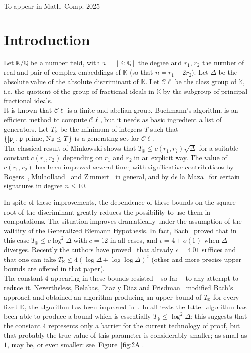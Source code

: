 \documentclass[a4paper,11pt]{amsart}
\newcommand{\field}[1]{\mathbb{{#1}}}
\newcommand{\ideal}[1]{\mathfrak{{#1}}}
\newcommand{\Q}{\field{{Q}}}
\newcommand{\K}{\field{{K}}}
\newcommand{\p}{\ideal{p}}
\newcommand{\Norm}{\textrm{\upshape N}}
\newcommand{\Cl}{\mathcal C\!\ell}
\theoremstyle{remark}
\begin{document}
\begin{center}
To appear in Math. Comp. 2025
\end{center}


\section{Introduction}\label{sec:1A}
Let $\K/\Q$ be a number field, with $n=[\K:\Q]$ the degree and $r_1$, $r_2$ the number of real and pair of
complex embeddings of $\K$ (so that $n=r_1+2r_2$). Let $\Delta$ be the absolute value of the absolute
discriminant of $\K$. Let $\Cl$ be the class group of $\K$, i.e. the quotient of the group of
fractional ideals in $\K$ by the subgroup of principal fractional ideals.\\
%
It is known that $\Cl$ is a finite and abelian group. Buchmann's algorithm is an efficient method to
compute $\Cl$, but it needs as basic ingredient a list of generators. Let $T_\K$ be the minimum of
integers $T$ such that $\{[\p]\colon \p\text{ prime, } \Norm\p \leq T\}$ is a generating set for
$\Cl$.\\
%
The classical result of Minkowski shows that $T_\K \leq c(r_1,r_2)\sqrt{\Delta}$ for a suitable constant
$c(r_1,r_2)$ depending on $r_1$ and $r_2$ in an explicit way. The value of $c(r_1,r_2)$ has been improved
several time, with significative contributions by Rogers~\cite{Rogers}, Mulholland~\cite{Mulholland} and
Zimmert~\cite{Zimmert} in general, and by de la Maza~\cite{Maza} for certain signatures in degree $n\leq
10$.

In spite of these improvements, the dependence of these bounds on the square root of the discriminant
greatly reduces the possibility to use them in computations. The situation improves dramatically under
the assumption of the validity of the Generalized Riemann Hypothesis. In fact, Bach~\cite{Bach2} proved
that in this case $T_\K \leq c\log^2\Delta$ with $c=12$ in all cases, and $c=4+o(1)$ when $\Delta$
diverges. Recently the authors have proved~\cite{GrenieMolteni7} that already $c = 4.01$ suffices and that
one can take $T_\K \leq 4(\log\Delta + \log\log\Delta)^2$ (other and more precise upper bounds are offered
in that paper).\\
The constant $4$ appearing in these bounds resisted -- so far -- to any attempt to reduce it.
Nevertheless, Belabas, Diaz y Diaz and Friedman~\cite{BelabasDiazyDiazFriedman} modified Bach's approach
and obtained an algorithm producing an upper bound of $T_\K$ for every fixed $\K$; the algorithm has been
improved in~\cite{GrenieMolteni7}. In all tests the latter algorithm has been able to produce a bound
which is essentially $T_\K \leq \log^2\Delta$: this suggests that the constant $4$ represents only a
barrier for the current technology of proof, but that probably the true value of this parameter is
considerably smaller; as small as $1$, may be, or even smaller: see~Figure~\ref{fig:2A}.
\end{document}
